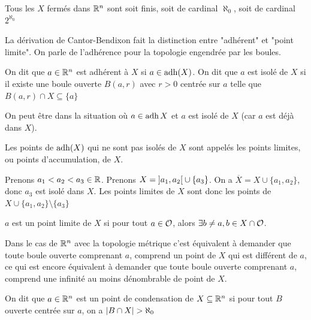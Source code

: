     \begin{theoreme}[Cantor]
      Tous les $X$ fermés dans $\mathbb{R}^n$ sont soit finis, soit de cardinal $\aleph_0$, soit de cardinal $2^{\aleph_0}$
  \end{theoreme}

  
  La dérivation de Cantor-Bendixon fait la distinction entre "adhérent" et "point limite".
  On parle de l'adhérence pour la topologie engendrée par les boules.
  
  \begin{definition}
      On dit que $a\in\mathbb{R}^n$ est adhérent à $X$ si $a\in\operatorname{adh}(X)$. On dit que $a$ est isolé de $X$ si il existe une boule ouverte $B(a,r)$ avec $r>0$ centrée sur $a$ telle que $B(a,r)\cap X \subseteq \{a\}$
  \end{definition}
  \begin{remarque}
      On peut être dans la situation où $a \in \operatorname{adh} X$ et $a$ est isolé de $X$ (car $a$ est déjà dans $X$).
  \end{remarque}
  \begin{definition}
      Les points de $\operatorname{adh}(X)$ qui ne sont pas isolés de $X$ sont appelés les points limites, ou points d'accumulation, de $X$.
  \end{definition}
  
  \begin{exemple}
      Prenons $a_1<a_2< a_3\in\mathbb{R}$. Prenons $X = \left] a_1,a_2\right[\cup \{a_3\}$.
      On a $\overline{X} = X\cup\{a_1,a_2\}$, donc $a_3$ est isolé dans $X$. Les points limites de $X$ sont donc les points de $X\cup\{a_1,a_2\}\setminus\{a_3\}$
  \end{exemple}

  \begin{definition}
      $a$ est un point limite de $X$ si pour tout $a\in \mathcal{O}$, alors $\exists b \neq a, b\in X\cap \mathcal{O} $.
  \end{definition}

  Dans le cas de $\mathbb{R} ^n$ avec la topologie métrique c'est équivalent à demander  que toute boule ouverte comprenant $a$, comprend un point de $X$ qui est différent de $a$, ce qui est encore équivalent à demander que toute boule ouverte comprenant $a$, comprend une infinité au moins dénombrable de point de $X$.

  \begin{definition}
      On dit que $a\in \mathbb{R}^n$ est un point de condensation de $X\subseteq \mathbb{R}^n$ si pour tout $B$ ouverte centrée sur $a$, on a $\abs{B\cap X}> \aleph_0$
  \end{definition}


